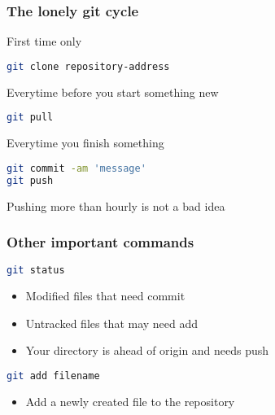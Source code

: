 \begin{frame}[fragile]
  \frametitle{The lonely git cycle}
  \begin{block}{First time only}
    \begin{lstlisting}[language=bash]
git clone repository-address
    \end{lstlisting}
    \end{block}
    \begin{block}{Everytime before you start something new}
    \begin{lstlisting}[language=bash]
git pull
    \end{lstlisting}      
    \end{block}
    \begin{block}{Everytime you finish something}
      \begin{lstlisting}[language=bash]
git commit -am 'message'
git push
     \end{lstlisting}
    \end{block}
    
Pushing more than hourly is not a bad idea
\end{frame}

\begin{frame}[fragile]
  \frametitle{Other important commands}
    \begin{block}{}
    \begin{lstlisting}[language=bash]
git status
    \end{lstlisting}      
    \end{block}
    \begin{itemize}
    \item Modified files that need commit
    \item Untracked files that may need add
    \item Your directory is ahead of origin and needs push
    \end{itemize}

    \begin{block}{}
    \begin{lstlisting}[language=bash]
git add filename
    \end{lstlisting}      
    \end{block}
    \begin{itemize}
    \item Add a newly created file to the repository
    \end{itemize}
\end{frame}

